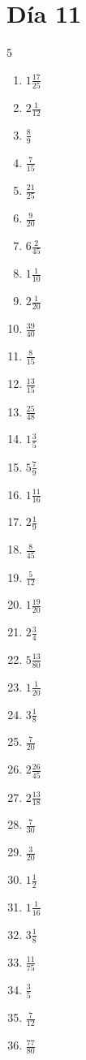 \documentclass[12pt]{article}
\begin{document}
\section*{Día 11}
\begin{multicols}{5}\begin{enumerate}
\item $ 1 \frac{17}{25} $
\item $ 2 \frac{1}{12} $
\item $ \frac{8}{9} $
\item $ \frac{7}{15} $
\item $ \frac{21}{25} $
\item $ \frac{9}{20} $
\item $ 6 \frac{2}{45} $
\item $ 1 \frac{1}{10} $
\item $ 2 \frac{1}{20} $
\item $ \frac{39}{40} $
\item $ \frac{8}{15} $
\item $ \frac{13}{15} $
\item $ \frac{25}{48} $
\item $ 1 \frac{3}{5} $
\item $ 5 \frac{7}{9} $
\item $ 1 \frac{11}{16} $
\item $ 2 \frac{1}{9} $
\item $ \frac{8}{45} $
\item $ \frac{5}{12} $
\item $ 1 \frac{19}{20} $
\item $ 2 \frac{3}{4} $
\item $ 5 \frac{13}{80} $
\item $ 1 \frac{1}{20} $
\item $ 3 \frac{1}{8} $
\item $ \frac{7}{20} $
\item $ 2 \frac{26}{45} $
\item $ 2 \frac{13}{18} $
\item $ \frac{7}{30} $
\item $ \frac{3}{20} $
\item $ 1 \frac{1}{2} $
\item $ 1 \frac{1}{16} $
\item $ 3 \frac{1}{8} $
\item $ \frac{11}{75} $
\item $ \frac{3}{5} $
\item $ \frac{7}{12} $
\item $ \frac{77}{80} $

\end{enumerate}
\end{multicols}
\end{document}
